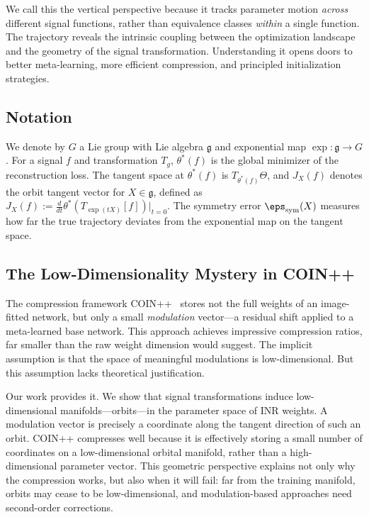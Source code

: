 We call this the vertical perspective because it tracks parameter motion \emph{across} different signal functions, rather than equivalence classes \emph{within} a single function.
The trajectory reveals the intrinsic coupling between the optimization landscape and the geometry of the signal transformation.
Understanding it opens doors to better meta-learning, more efficient compression, and principled initialization strategies.

\subsection{Notation}

We denote by $G$ a Lie group with Lie algebra $\mathfrak{g}$ and exponential map $\exp: \mathfrak{g} \to G$.
For a signal $f$ and transformation $T_g$, $\theta^*(f)$ is the global minimizer of the reconstruction loss.
The tangent space at $\theta^*(f)$ is $T_{\theta^*(f)}\Theta$, and $J_X(f)$ denotes the orbit tangent vector for $X \in \mathfrak{g}$, defined as $J_X(f) := \frac{d}{dt}\theta^*(T_{\exp(tX)}[f])\big|_{t=0}$.
The symmetry error $\eps_{\mathrm{sym}}(X)$ measures how far the true trajectory deviates from the exponential map on the tangent space.



\subsection{The Low-Dimensionality Mystery in COIN++}

The compression framework COIN++~\citep{dupont2022coinpp} stores not the full weights of an image-fitted network, but only a small \emph{modulation} vector---a residual shift applied to a meta-learned base network.
This approach achieves impressive compression ratios, far smaller than the raw weight dimension would suggest.
The implicit assumption is that the space of meaningful modulations is low-dimensional.
But this assumption lacks theoretical justification.

Our work provides it.
We show that signal transformations induce low-dimensional manifolds---orbits---in the parameter space of INR weights.
A modulation vector is precisely a coordinate along the tangent direction of such an orbit.
COIN++ compresses well because it is effectively storing a small number of coordinates on a low-dimensional orbital manifold, rather than a high-dimensional parameter vector.
This geometric perspective explains not only why the compression works, but also when it will fail: far from the training manifold, orbits may cease to be low-dimensional, and modulation-based approaches need second-order corrections.


